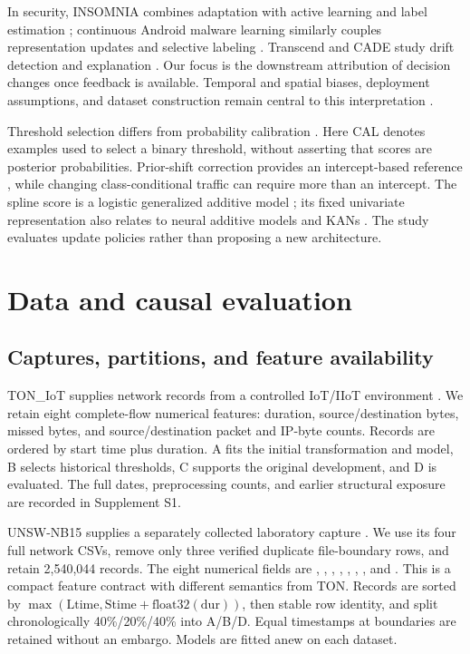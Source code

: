 In security, INSOMNIA combines adaptation with active learning and label estimation \citep{andresini2021}; continuous Android malware learning similarly couples representation updates and selective labeling \citep{chen2023}. Transcend and CADE study drift detection and explanation \citep{jordaney2017,yang2021}. Our focus is the downstream attribution of decision changes once feedback is available. Temporal and spatial biases, deployment assumptions, and dataset construction remain central to this interpretation \citep{pendlebury2019,arp2022,sommer2010,engelen2021}.

Threshold selection differs from probability calibration \citep{guo2017}. Here CAL denotes examples used to select a binary threshold, without asserting that scores are posterior probabilities. Prior-shift correction provides an intercept-based reference \citep{saerens2002,lipton2018}, while changing class-conditional traffic can require more than an intercept. The spline score is a logistic generalized additive model \citep{hastie1986}; its fixed univariate representation also relates to neural additive models and KANs \citep{agarwal2021,liu2025}. The study evaluates update policies rather than proposing a new architecture.

\section{Data and causal evaluation}
\subsection{Captures, partitions, and feature availability}
TON\_IoT supplies network records from a controlled IoT/IIoT environment \citep{moustafa2021,booij2022}. We retain eight complete-flow numerical features: duration, source/destination bytes, missed bytes, and source/destination packet and IP-byte counts. Records are ordered by start time plus duration. A fits the initial transformation and model, B selects historical thresholds, C supports the original development, and D is evaluated. The full dates, preprocessing counts, and earlier structural exposure are recorded in Supplement S1.

UNSW-NB15 supplies a separately collected laboratory capture \citep{moustafa2015unsw,moustafa2016unsw}. We use its four full network CSVs, remove only three verified duplicate file-boundary rows, and retain 2,540,044 records. The eight numerical fields are , , , , , , , and . This is a compact feature contract with different semantics from TON. Records are sorted by $\max(\mathrm{Ltime},\mathrm{Stime}+\mathrm{float32}(\mathrm{dur}))$, then stable row identity, and split chronologically 40\%/20\%/40\% into A/B/D. Equal timestamps at boundaries are retained without an embargo. Models are fitted anew on each dataset.

